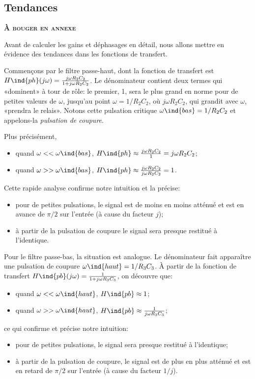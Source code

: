 \subsection{Tendances}

\textbf{\textsc{À bouger en annexe}}

Avant de calculer les gains et déphasages en détail,
nous allons mettre en évidence des tendances dans les fonctions de transfert.

Commençons par le filtre passe-haut, dont la fonction de transfert est
$H\ind{ph}(j\omega) = \frac{j\omega R_2C_2}{1+j\omega R_2C_2}$.
Le dénominateur contient deux termes qui «dominent» à tour de rôle:
le premier, 1, sera le plus grand en norme pour de petites valeurs de $\omega$,
jusqu'au point $\omega = 1/R_2C_2$, où $j\omega R_2C_2$, qui grandit
avec $\omega$, «prendra le relais».
Notons cette pulsation critique $\omega\ind{bas}= 1/R_2C_2$ et
appelons-la \emph{pulsation de coupure}.

Plus précisément,
\begin{itemize}
    \item quand $\omega << \omega\ind{bas}$,
        $H\ind{ph} \approx \frac{j\omega R_2C_2}{1} = j\omega R_2C_2$;
    \item quand $\omega >> \omega\ind{bas}$,
        $H\ind{ph} \approx \frac{j\omega R_2C_2}{j\omega R_2C_2} = 1$.
\end{itemize}

Cette rapide analyse confirme notre intuition et la précise:
\begin{itemize}
    \item pour de petites pulsations,
        le signal est de moins en moins atténué et est en avance de $\pi/2$
        sur l'entrée (à cause du facteur $j$);
    \item à partir de la pulsation de coupure le signal sera presque
        restitué à l'identique.
\end{itemize}

Pour le filtre passe-bas, la situation est analogue.
Le dénominateur fait apparaître une pulsation de coupure
$\omega\ind{haut} = 1/R_3C_3$.
À partir de la fonction de transfert
$H\ind{pb}(j\omega) = \frac{1}{1 + j\omega R_3C_3}$,
on découvre que:
\begin{itemize}
    \item quand $\omega << \omega\ind{haut}$, $H\ind{pb} \approx 1$;
    \item quand $\omega >> \omega\ind{haut}$, $H\ind{pb}
        \approx \frac{1}{j\omega R_3C_3}$;
\end{itemize}
ce qui confirme et précise notre intuition:
\begin{itemize}
    \item pour de petites pulsations, le signal sera presque restitué
        à l'identique;
    \item à partir de la pulsation de coupure, le signal est de plus en plus
        atténué
        et est en retard de $\pi/2$ sur l'entrée (à cause du facteur $1/j$).
\end{itemize}
